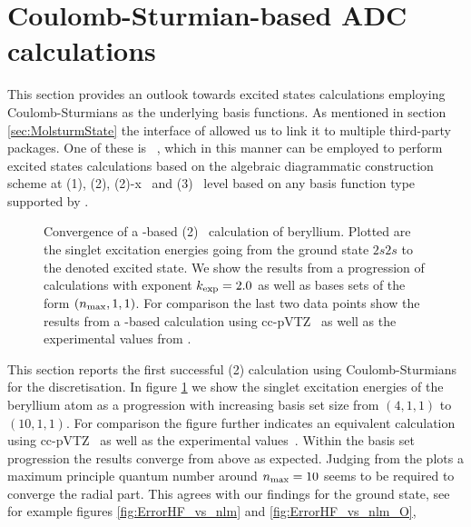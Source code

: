 \section{Coulomb-Sturmian-based ADC calculations}
\label{sec:SturmianADC}
This section provides an outlook towards excited states calculations
employing Coulomb-Sturmians as the underlying basis functions.
As mentioned in section \vref{sec:MolsturmState} the \python interface
of \molsturm allowed us to link it to multiple third-party packages.
One of these is \adcman~\cite{Wormit2014},
which in this manner can be employed to perform excited states calculations
based on the algebraic diagrammatic construction scheme at
{\ADC}(1), {\ADC}(2), {\ADC}(2)-x~\cite{Schirmer1982}
and {\ADC}(3)~\cite{Trofimov1999} level
based on any basis function type supported by \molsturm.

\begin{figure}
	\centering
	\caption[
		Convergence of a \CS-based {\ADC}(2) calculation of beryllium
	]{
		Convergence of a \CS-based {\ADC}(2)~\cite{Schirmer1982}
		calculation of beryllium.
		Plotted are the singlet excitation energies
		going from the ground state $2s2s$ to the denoted excited state.
		We show the results from a progression
		of \CS calculations with exponent $k_\text{exp} = 2.0$
		as well as bases sets of the form $(n_\text{max}, 1, 1)$.
		For comparison the last two data points
		show the results from a \cGTO-based calculation
		using cc-pVTZ~\cite{Prascher2011}
		as well as the experimental values from \citet{Moore1949}.
	}
	\label{fig:SturmianAdcResults}
\end{figure}
This section reports the first successful {\ADC}(2)
calculation using Coulomb-Sturmians for the discretisation.
In figure \ref{fig:SturmianAdcResults} we show the singlet excitation energies
of the beryllium atom
as a progression with increasing \CS basis set size from $(4,1,1)$ to $(10,1,1)$.
For comparison the figure further indicates an equivalent calculation
using cc-pVTZ~\cite{Prascher2011} as well as the experimental values~\cite{Moore1949}.
Within the \CS basis set progression the results converge from above as expected.
Judging from the plots
a maximum principle quantum number around $n_\text{max} = 10$
seems to be required to converge the radial part.
This agrees with our findings for the ground state,
see for example figures \vref{fig:ErrorHF_vs_nlm} and \vref{fig:ErrorHF_vs_nlm_O},

